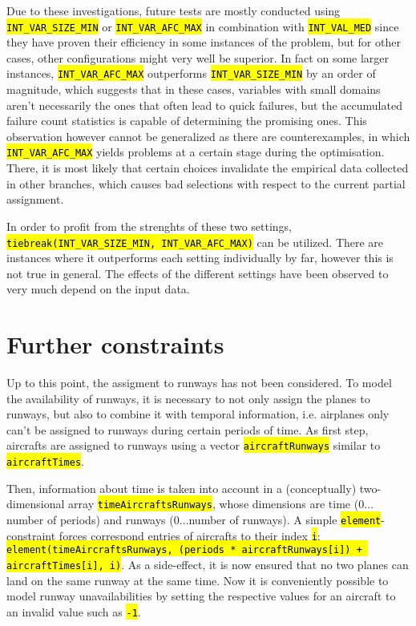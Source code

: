 \documentclass[,%
			paper=a4,%
			DIV12,
			liststotoc,
			bibtotoc,
			draft=false,%
			numbers=noendperiod
			]{scrartcl}
\newcommand{\ilc}[1]{\hl{\texttt{#1}}}
\newcommand{\mymarginnote}[1]{\marginnote{\footnotesize{#1}}}
\begin{document}
Due to these investigations, future tests are mostly conducted using \ilc{INT\_VAR\_SIZE\_MIN} or \ilc{INT\_VAR\_AFC\_MAX} in combination with \ilc{INT\_VAL\_MED} since they have proven their efficiency in some instances of the problem, but for other cases, other configurations might very well be superior.
In fact on some larger instances, \ilc{INT\_VAR\_AFC\_MAX} outperforms \ilc{INT\_VAR\_SIZE\_MIN} by an order of magnitude, which suggests that in these cases, variables with small domains aren't necessarily the ones that often lead to quick failures, but the accumulated failure count statistics is capable of determining the promising ones.
This observation however cannot be generalized as there are counterexamples, in which \ilc{INT\_VAR\_AFC\_MAX} yields problems at a certain stage during the optimisation. There, it is most likely that certain choices invalidate the empirical data collected in other branches, which causes bad selections with respect to the current partial assignment.

In order to profit from the strenghts of these two settings, \ilc{tiebreak(INT\_VAR\_SIZE\_MIN, INT\_VAR\_AFC\_MAX)} can be utilized. There are instances where it outperforms each setting individually by far, however this is not true in general. The effects of the different settings have been observed to very much depend on the input data. 

\section{Further constraints}

\mymarginnote{\Crunway}
Up to this point, the assigment to runways has not been considered. 
To model the availability of runways, it is necessary to not only assign the planes to runways, but also to combine it with temporal information, i.e. airplanes only can't be assigned to runways during certain periods of time.
As first step, aircrafts are assigned to runways using a vector \ilc{aircraftRunways} similar to \ilc{aircraftTimes}. 

Then, information about time is taken into account in a (conceptually) two-dimensional array \ilc{timeAircraftsRunways}, whose dimensions are time ($0\dots$number of periods) and runways ($0\dots$number of runways). A simple \ilc{element}-constraint forces correspond entries of aircrafts to their index \ilc{i}: \ilc{element(timeAircraftsRunways, (periods * aircraftRunways[i]) + aircraftTimes[i], i)}.
As a side-effect, it is now ensured that no two planes can land on the same runway at the same time.
Now it is conveniently possible to model runway unavailabilities by setting the respective values for an aircraft to an invalid value such as \ilc{-1}.
\end{document}
